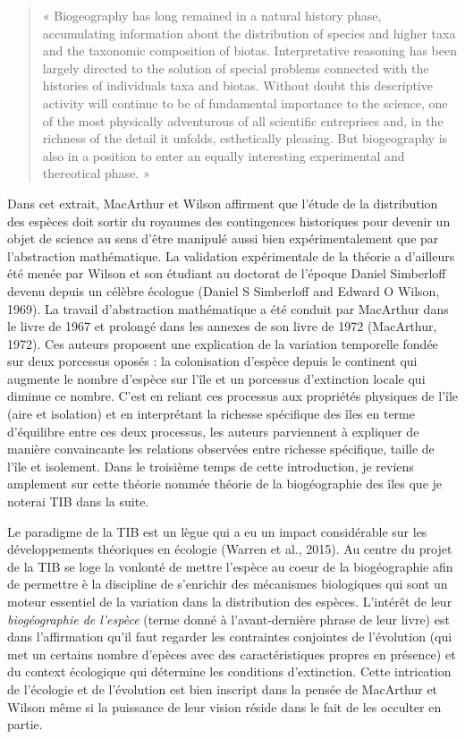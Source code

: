\begin{quote}
« Biogeography has long remained in a natural history phase,
accumulating information about the distribution of species and higher
taxa and the taxonomic composition of biotas. Interpretative reasoning
has been largely directed to the solution of special problems connected
with the histories of individuals taxa and biotas. Without doubt this
descriptive activity will continue to be of fundamental importance to
the science, one of the most physically adventurous of all scientific
entreprises and, in the richness of the detail it unfolds, esthetically
pleasing. But biogeography is also in a position to enter an equally
interesting experimental and thereotical phase. »
\end{quote}

Dans cet extrait, MacArthur et Wilson affirment que l'étude de la
distribution des espèces doit sortir du royaumes des contingences
historiques pour devenir un objet de science au sens d'être manipulé
aussi bien expérimentalement que par l'abstraction mathématique. La
validation expérimentale de la théorie a d'ailleurs été menée par Wilson
et son étudiant au doctorat de l'époque Daniel Simberloff devenu depuis
un célèbre écologue (Daniel S Simberloff and Edward O Wilson, 1969). La
travail d'abstraction mathématique a été conduit par MacArthur dans le
livre de 1967 et prolongé dans les annexes de son livre de 1972
(MacArthur, 1972). Ces auteurs proposent une explication de la variation
temporelle fondée sur deux porcessus oposés : la colonisation d'espèce
depuis le continent qui augmente le nombre d'espèce sur l'île et un
porcessus d'extinction locale qui diminue ce nombre. C'est en reliant
ces processus aux propriétés physiques de l'île (aire et isolation) et
en interprétant la richesse spécifique des îles en terme d'équilibre
entre ces deux processus, les auteurs parviennent à expliquer de manière
convaincante les relations observées entre richesse spécifique, taille
de l'île et isolement. Dans le troisième temps de cette introduction, je
reviens amplement sur cette théorie nommée théorie de la biogéographie
des îles que je noterai TIB dans la suite.

Le paradigme de la TIB est un lègue qui a eu un impact considérable sur
les développements théoriques en écologie (Warren et al., 2015). Au
centre du projet de la TIB se loge la vonlonté de mettre l'espèce au
coeur de la biogéographie afin de permettre è la discipline de
s'enrichir des mécanismes biologiques qui sont un moteur essentiel de la
variation dans la distribution des espèces. L'intérêt de leur
\emph{biogéographie de l'espèce} (terme donné à l'avant-dernière phrase
de leur livre) est dans l'affirmation qu'il faut regarder les
contraintes conjointes de l'évolution (qui met un certains nombre
d'epèces avec des caractéristiques propres en présence) et du context
écologique qui détermine les conditions d'extinction. Cette intrication
de l'écologie et de l'évolution est bien inscript dans la pensée de
MacArthur et Wilson même si la puissance de leur vision réside dans le
fait de les occulter en partie.


